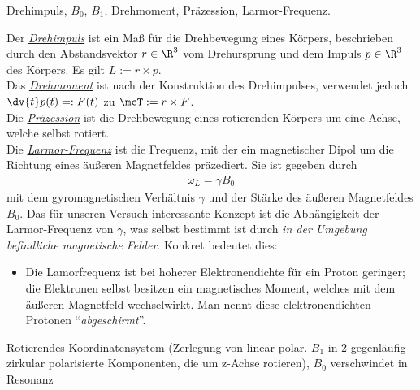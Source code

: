 \documentclass{subfiles}
\begin{document}
    \begin{Frage}
        Drehimpuls, $B_0$, $B_1$, Drehmoment, Präzession, Larmor-Frequenz.
    \end{Frage}
    \begin{Antwort}
        Der \href{https://de.wikipedia.org/wiki/Drehimpuls}{\emph{Drehimpuls}} ist ein Maß für die Drehbewegung eines Körpers, beschrieben durch den Abstandsvektor $r\in\R^3$ vom Drehursprung und dem Impuls $p\in\R^3$ des Körpers. Es gilt $L := r\times p$.\\

        Das \href{https://de.wikipedia.org/wiki/Drehmoment}{\emph{Drehmoment}} ist nach der Konstruktion des Drehimpulses, verwendet jedoch $\dv{t}p(t) =: F(t)$ zu $\mcT := r\times F$. \\

        Die \href{https://de.wikipedia.org/w/index.php?title=Präzession&oldid=235094402}{\emph{Präzession}} ist die Drehbewegung eines rotierenden Körpers um eine Achse, welche selbst rotiert. \\

        Die \href{https://de.wikipedia.org/wiki/Larmorpräzession}{\emph{Larmor-Frequenz}} ist die Frequenz, mit der ein magnetischer Dipol um die Richtung eines äußeren Magnetfeldes präzediert. Sie ist gegeben durch
        \begin{align}
            \omega_L = \gamma B_0\label{eq:LarmorFrequenz}
        \end{align}
        mit dem gyromagnetischen Verhältnis $\gamma$ und der Stärke des äußeren Magnetfeldes $B_0$. Das für unseren Versuch interessante Konzept ist die Abhängigkeit der Larmor-Frequenz von $\gamma$, was selbst bestimmt ist durch \emph{in der Umgebung befindliche magnetische Felder}. Konkret bedeutet dies:
        \begin{itemize}[label=$\to$]
            \item Die Lamorfrequenz ist bei hoherer Elektronendichte für ein Proton geringer; die Elektronen selbst besitzen ein magnetisches Moment, welches mit dem äußeren Magnetfeld wechselwirkt. Man nennt diese elektronendichten Protonen \enquote{\emph{abgeschirmt}}.
        \end{itemize}
    \end{Antwort}


    \begin{Frage}
        Rotierendes Koordinatensystem (Zerlegung von linear polar. $B_1$ in 2 gegenläufig zirkular polarisierte Komponenten, die um z-Achse rotieren), $B_0$ verschwindet in Resonanz
    \end{Frage}
    \begin{Antwort}
        
    \end{Antwort}
\end{document}
